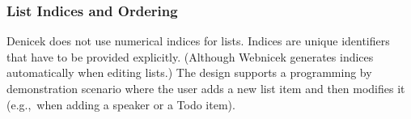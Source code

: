 \documentclass[sigconf,anonymous,screen]{acmart}
\newcommand{\ident}[1]{{\sffamily #1}}
\begin{document}
%
%


%


\subsubsection*{List Indices and Ordering}
Denicek does not use numerical indices for lists. Indices are unique identifiers that have to
be provided explicitly. (Although Webnicek generates indices automatically when editing lists.)
The design supports a programming by demonstration scenario where the user adds a new list item
and then modifies it (e.g.,~when adding a speaker or a Todo item).
\end{document}
